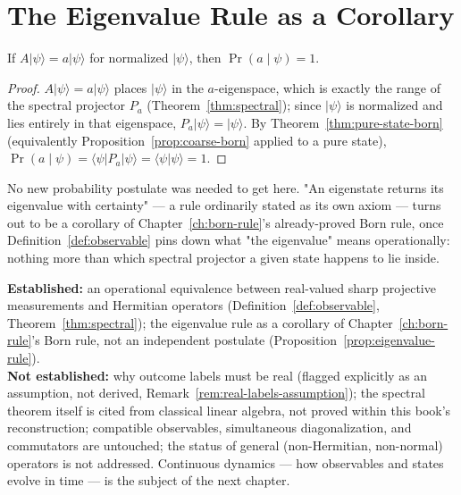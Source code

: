 \section{The Eigenvalue Rule as a Corollary}

\begin{proposition}
\label{prop:eigenvalue-rule}
If $A|\psi\rangle = a|\psi\rangle$ for normalized $|\psi\rangle$, then
$\Pr(a\mid\psi) = 1$.
\end{proposition}

\begin{proof}
$A|\psi\rangle=a|\psi\rangle$ places $|\psi\rangle$ in the $a$-eigenspace,
which is exactly the range of the spectral projector $P_a$
(Theorem~\ref{thm:spectral}); since $|\psi\rangle$ is normalized and lies
entirely in that eigenspace, $P_a|\psi\rangle = |\psi\rangle$. By
Theorem~\ref{thm:pure-state-born} (equivalently
Proposition~\ref{prop:coarse-born} applied to a pure state),
$\Pr(a\mid\psi) = \langle\psi|P_a|\psi\rangle = \langle\psi|\psi\rangle = 1$.
\end{proof}

No new probability postulate was needed to get here. "An eigenstate returns
its eigenvalue with certainty" — a rule ordinarily stated as its own
axiom — turns out to be a corollary of Chapter~\ref{ch:born-rule}'s
already-proved Born rule, once Definition~\ref{def:observable} pins down
what "the eigenvalue" means operationally: nothing more than which spectral
projector a given state happens to lie inside.

\begin{ledgerentry}
\textbf{Established:} an operational equivalence between real-valued sharp
projective measurements and Hermitian operators
(Definition~\ref{def:observable}, Theorem~\ref{thm:spectral}); the
eigenvalue rule as a corollary of Chapter~\ref{ch:born-rule}'s Born rule, not
an independent postulate (Proposition~\ref{prop:eigenvalue-rule}).\\
\textbf{Not established:} why outcome labels must be real (flagged explicitly
as an assumption, not derived, Remark~\ref{rem:real-labels-assumption}); the
spectral theorem itself is cited from classical linear algebra, not proved
within this book's reconstruction; compatible observables, simultaneous
diagonalization, and commutators are untouched; the status of general
(non-Hermitian, non-normal) operators is not addressed. Continuous dynamics
— how observables and states evolve in time — is the subject of the next
chapter.
\end{ledgerentry}
